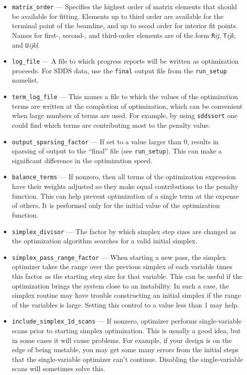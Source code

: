 \documentclass[11pt]{article}
\begin{document}
\begin{itemize}
\item \verb|matrix_order| --- Specifies the highest order of matrix elements that
should be available for fitting.  Elements up to third order are available for
the terminal point of the beamline, and up to secod order for interior fit points.
Names for first-, second-, and third-order elements are of the form
{\tt R}{\em ij}, {\tt T}{\em ijk}, and {\tt U}{\em ijkl}.
\item \verb|log_file| --- A file to which progress reports will be written as optimization proceeds.
For SDDS data, use the \verb|final| output file from the \verb|run_setup| namelist.

\item \verb|term_log_file| --- This names a file to which the
  values of the optimization terms are written at the completion of optimization, which can be convenient when large numbers
  of terms are used.  For example, by using \verb|sddssort| one could find which terms are contributing most to the
  penalty value.

\item \verb|output_sparsing_factor| --- If set to a value larger than 0, results in
sparsing of output to the ``final'' file (see \verb|run_setup|). This can make
a significant difference in the optimization speed.

\item \verb|balance_terms| --- If nonzero, then all terms of the optimization expression have
 their weights adjusted so they make equal contributions to the penalty function.  This can
 help prevent optimization of a single term at the expense of others.  It is performed only 
 for the initial value of the optimization function.

\item \verb|simplex_divisor| --- The factor by which simplex step sizes are changed as the 
 optimization algorithm searches for a valid initial simplex.

\item \verb|simplex_pass_range_factor| --- When starting a new pass, the simplex optimizer takes
 the range over the previous simplex of each variable times this factor
 as the starting step size for that variable.  This can be useful if the optimization brings
 the system close to an instability.  In such a case, the simplex routine may have trouble
 constructing an initial simplex if the range of the variables is large. Setting this control
 to a value less than 1 may help.
 
\item \verb|include_simplex_1d_scans| --- If nonzero, optimizer performs single-variable scans prior to 
 starting simplex optimization.  This is usually a good idea, but in some cases it will cause problems.
 For example, if your design is on the edge of being unstable, you may get some many errors from the
 initial steps that the single-variable optimizer can't continue.  Disabling the
 single-variable scans will sometimes solve this.


\end{itemize}
\end{document}
